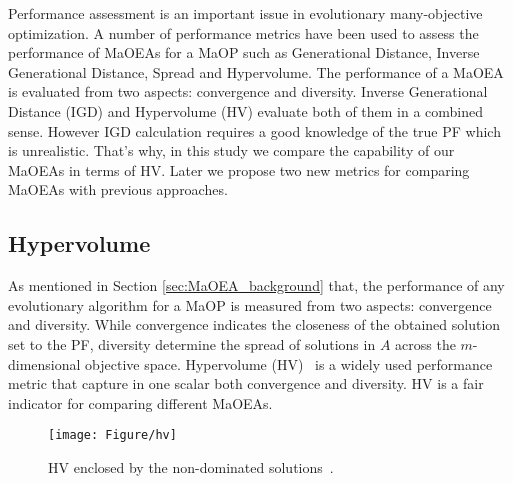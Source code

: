 
Performance assessment is an important issue in evolutionary many-objective optimization. A number of performance metrics have been used to assess the performance of MaOEAs for a MaOP such as Generational Distance, Inverse Generational Distance, Spread and Hypervolume. The performance of a MaOEA is evaluated from two aspects: convergence and diversity. Inverse Generational Distance (IGD) and Hypervolume (HV) evaluate both of them in a combined sense. However IGD calculation requires a good knowledge of the true PF which is unrealistic. That's why, in this study we compare the capability of our MaOEAs in terms of HV. Later we propose two new metrics for comparing MaOEAs with previous approaches. 

\subsection{Hypervolume}

As mentioned in Section \ref{sec:MaOEA_background} that, the performance of any evolutionary algorithm for a MaOP is measured from two aspects: convergence and diversity. While convergence indicates the closeness of the obtained solution set to the PF, diversity determine the spread of solutions in $A$ across the $m$-dimensional objective space. Hypervolume (HV)~\cite{zitzler1999multiobjective} is a widely used performance metric that capture in one scalar both convergence and diversity. HV is a fair indicator for comparing different MaOEAs.

\begin{figure} [!htbp]
	\centering
	\texttt{[image: Figure/hv]}\\
	\caption{HV enclosed by the non-dominated solutions~\cite{deb2001multi}.}\label{fig:hv} 
\end{figure}

